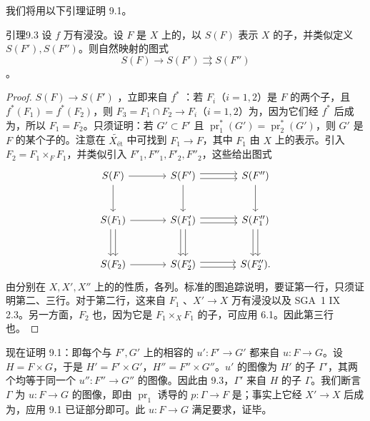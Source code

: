 我们将用以下引理证明 9.1。
\begin{SGAresult}{引理}{9.3}
设 $f$ 万有浸没。设 $F$ 是 $X$ 上的，以 $S(F)$ 表示 $X$ 的子，并类似定义 $S(F'),S(F'')$。则自然映射的图式
\[S(F)\longrightarrow S(F')\rightrightarrows S(F'')\]
。
\end{SGAresult}
\begin{proof}
$S(F)\to S(F')$ ，立即来自 $f^*$ ：若 $F_i$（$i=1,2$）是 $F$ 的两个子，且 $f^*(F_1)=f^*(F_2)$，则 $F_3=F_1\cap F_2\to F_i$（$i=1,2$）为，因为它们经 $f^*$ 后成为，所以 $F_1=F_2$。只须证明：若 $G'\subset F'$ 且 $\operatorname{pr}_1^*(G')=\operatorname{pr}_2^*(G')$，则 $G'$ 是 $F$ 的某个子的。注意在 $\widetilde{X_{\text{ét}}}$ 中可找到 $F_1\to F$，其中 $F_1$ 由 $X$ 上的表示。引入 $F_2=F_1\times_F F_1$，并类似引入 $F'_1,F''_1,F'_2,F''_2$，这些给出图式
\[\begin{tikzcd}[column sep=large,row sep=large]
S(F)\arrow[r]\arrow[d]&S(F')\arrow[r,shift left]\arrow[r,shift right]\arrow[d]&S(F'')\arrow[d]\\
S(F_1)\arrow[r]\arrow[d,shift left]\arrow[d,shift right]&S(F'_1)\arrow[r,shift left]\arrow[r,shift right]\arrow[d,shift left]\arrow[d,shift right]&S(F''_1)\arrow[d,shift left]\arrow[d,shift right]\\
S(F_2)\arrow[r]&S(F'_2)\arrow[r,shift left]\arrow[r,shift right]&S(F''_2).
\end{tikzcd}\]
由分别在 $X,X',X''$ 上的的性质，各列。标准的图追踪说明，要证第一行，只须证明第二、三行。对于第二行，这来自 $F_1$ 、$X'\to X$ 万有浸没以及 SGA~1 IX 2.3。另一方面，$F_2$ 也，因为它是 $F_1\times_X F_1$ 的子，可应用 6.1。因此第三行也。
\end{proof}
现在证明 9.1：即每个与 $F',G'$ 上的相容的 $u':F'\to G'$ 都来自 $u:F\to G$。设 $H=F\times G$，于是 $H'=F'\times G'$，$H''=F''\times G''$。$u'$ 的图像为 $H'$ 的子 $\Gamma'$，其两个均等于同一个 $u'':F''\to G''$ 的图像。因此由 9.3，$\Gamma'$ 来自 $H$ 的子 $\Gamma$。我们断言 $\Gamma$ 为 $u:F\to G$ 的图像，即由 $\operatorname{pr}_1$ 诱导的 $p:\Gamma\to F$ 是；事实上它经 $X'\to X$ 后成为，应用 9.1 已证部分即可。此 $u:F\to G$ 满足要求，证毕。
